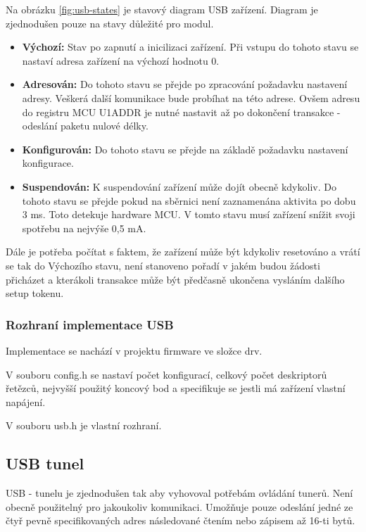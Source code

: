 Na obrázku \ref{fig:usb-states} je stavový diagram USB zařízení. Diagram je zjednodušen pouze na stavy důležité pro modul.
\begin{itemize}
\item \textbf{Výchozí:} Stav po zapnutí a inicilizaci zařízení. Při vstupu do tohoto stavu se nastaví adresa zařízení na výchozí hodnotu 0.
\item \textbf{Adresován:} Do tohoto stavu se přejde po zpracování požadavku nastavení adresy. Veškerá další komunikace bude probíhat na této adrese. Ovšem adresu do registru MCU U1ADDR je nutné nastavit až po dokončení transakce - odeslání paketu nulové délky.
\item \textbf{Konfigurován:} Do tohoto stavu se přejde na základě požadavku nastavení konfigurace. 
\item \textbf{Suspendován:} K suspendování zařízení může dojít obecně kdykoliv. Do tohoto stavu se přejde pokud na sběrnici není zaznamenána aktivita po dobu 3 ms. Toto detekuje hardware MCU. V tomto stavu musí zařízení snížit svoji spotřebu na nejvýše 0,5 mA.
\end{itemize}

Dále je potřeba počítat s faktem, že zařízení může být kdykoliv resetováno a vrátí se tak do Výchozího stavu, není stanoveno pořadí v jakém budou žádosti přicházet a kterákoli transakce může být předčasně ukončena vysláním dalšího setup tokenu. 



\subsubsection{Rozhraní implementace USB}
Implementace se nachází v projektu firmware ve složce drv.


V souboru config.h se nastaví počet konfigurací, celkový počet deskriptorů řetězců, nejvyšší použitý koncový bod a specifikuje se jestli má zařízení vlastní napájení.

V souboru usb.h je vlastní rozhraní.




\subsection{USB \iic tunel}
USB - \iic tunelu je zjednodušen tak aby vyhovoval potřebám ovládání tunerů. Není obecně použitelný pro jakoukoliv \iic komunikaci. Umožňuje pouze odeslání jedné ze čtyř pevně specifikovaných adres následované čtením nebo zápisem až 16-ti bytů.

